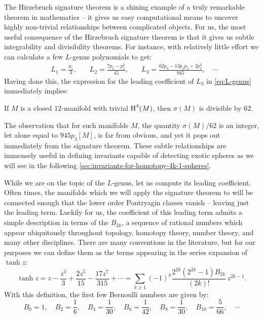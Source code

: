 The Hirzebruch signature theorem is a shining example of a truly remarkable theorem in mathematics -- it gives us easy computational means to uncover highly non-trivial relationships between complicated objects. For us, the most useful consequence of the Hirzebruch signature theorem is that it gives us subtle integrability and divisibility theorems. For instance, with relatively little effort we can calculate a few $L$-genus polynomials to get:
\begin{equation}\label{eq:L-genus}
	\begin{aligned}
		 & L_1 = \frac{p_1}{3},\quad
		 & L_2 = \frac{7p_2 - p_1^2}{45},\quad
		 & L_3 = \frac{62p_3 - 13p_1p_2 + 2p_1^3}{945},\quad\cdots
	\end{aligned}
\end{equation}
Having done this, the expression for the leading coefficient of $L_3$ in \cref{eq:L-genus} immediately implies:
\begin{corollary}
	If $M$ is a closed $12$-manifold with trivial $\operatorname{H}^4(M)$, then $\sigma(M)$ is divisible by $62$.
\end{corollary}
The observation that for such manifolds $M$, the quantity $\sigma(M)/62$ is an integer, let alone equal to $945p_3[M]$, is far from obvious, and yet it pops out immediately from the signature theorem. These subtle relationships are immensely useful in defining invariants capable of detecting exotic spheres as we will see in the following \cref{sec:invariants-for-homotopy-4k-1-spheres}.

While we are on the topic of the $L$-genus, let us compute its leading coefficient. Often times, the manifolds which we will apply the signature theorem to will be connected enough that the lower order Pontryagin classes vanish -- leaving just the leading term.
Luckily for us, the coefficient of this leading term admits a simple description in terms of the  $B_{2k}$, a sequence of rational numbers which appear ubiquitously throughout topology, homotopy theory, number theory, and many other disciplines. There are many conventions in the literature, but for our purposes we can define them as the terms appearing in the series expansion of $\tanh z$:
\begin{equation}\label{eq:tanh_series}
	\tanh z = z - \frac{z^3}{3} + \frac{2z^5}{15} - \frac{17z^7}{315}+\cdots = \sum_{k\geq 1} (-1)^k\frac{2^{2k}(2^{2k}-1)B_{2k}}{(2k)!}\, z^{2k-1}.
\end{equation}
With this definition, the first few Bernoulli numbers are given by:
\begin{equation}\label{eq:bernoulli_numbers}
	B_0 = 1,\quad B_2 = \frac{1}{6},\quad B_4 = \frac{1}{30},\quad B_6=\frac{1}{42},\quad B_{8}=\frac{1}{30},\quad B_{10} = \frac{5}{66},\quad\cdots
\end{equation}

